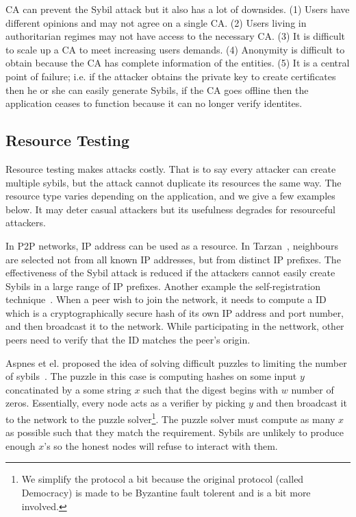 CA can prevent the Sybil attack but it also has a lot of downsides. (1) Users
have different opinions and may not agree on a single CA. (2) Users living in
authoritarian regimes may not have access to the necessary CA. (3) It is
difficult to scale up a CA to meet increasing users demands. (4) Anonymity is
difficult to obtain because the CA has complete information of the entities. (5)
It is a central point of failure; i.e. if the attacker obtains the private key
to create certificates then he or she can easily generate Sybils, if the CA goes
offline then the application ceases to function because it can no longer verify
identites.


\subsection{Resource Testing}\label{sec:resource-testing}
Resource testing makes attacks costly. That is to say every attacker can create
multiple sybils, but the attack cannot duplicate its resources the same way. The
resource type varies depending on the application, and we give a few examples
below. It may deter casual attackers but its usefulness degrades for resourceful
attackers.


In P2P networks, IP address can be used as a resource. In
Tarzan~\cite{freedman2002tarzan}, neighbours are selected not from all known IP
addresses, but from distinct IP prefixes. The effectiveness of the Sybil attack
is reduced if the attackers cannot easily create Sybils in a large range of IP
prefixes. Another example the self-registration
technique~\cite{dinger2006defending}. When a peer wish to join the network, it
needs to compute a ID which is a cryptographically secure hash of its own IP
address and port number, and then broadcast it to the network. While
participating in the nettwork, other peers need to verify that the ID matches
the peer's origin.

Aspnes et el. proposed the idea of solving difficult puzzles to limiting the
number of sybils~\cite{aspnes2005exposing}. The puzzle in this case is computing
hashes on some input $y$ concatinated by a some string $x$ such that the digest
begins with $w$ number of zeros. Essentially, every node acts as a verifier by
picking $y$ and then broadcast it to the network to the puzzle
solver\footnote{We simplify the protocol a bit because the original protocol
  (called Democracy) is made to be Byzantine fault tolerent and is a bit more
  involved.}. The puzzle solver must compute as many $x$ as possible such that
they match the requirement. Sybils are unlikely to produce enough $x$'s so the
honest nodes will refuse to interact with them.


